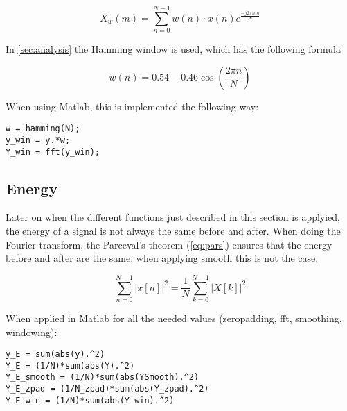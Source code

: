 \begin{equation}
\label{eq:window}
X_w(m) = \sum_{n=0}^{N-1} w(n)\cdot x(n)e^{\frac{-j2\pi nm}{N}}
\end{equation}

In \cref{sec:analysis} the Hamming window is used, which has the following formula

\begin{equation}
\label{eq:hamming}
w(n) = 0.54-0.46\cos\left(\frac{2\pi n}{N}\right)
\end{equation}

When using Matlab, this is implemented the following way:

\begin{verbatim}
w = hamming(N);
y_win = y.*w;
Y_win = fft(y_win);
\end{verbatim}

\subsection{Energy}
Later on when the different functions just described in this section is applyied, the energy of a signal is not always the same before and after. When doing the Fourier transform, the Parceval's theorem (\cref{eq:pars}) ensures that the energy before and after are the same, when applying smooth this is not the case.

\begin{equation}
	\sum_{n=0}^{N-1}\left|x\left[n\right]\right|^2=\frac{1}{N}\sum_{k=0}^{N-1}\left|X\left[k\right]\right|^2
	\label{eq:pars}
\end{equation}

When applied in Matlab for all the needed values (zeropadding, fft, smoothing, windowing):

\begin{verbatim}
y_E = sum(abs(y).^2)
Y_E = (1/N)*sum(abs(Y).^2)
Y_E_smooth = (1/N)*sum(abs(YSmooth).^2)
Y_E_zpad = (1/N_zpad)*sum(abs(Y_zpad).^2)
Y_E_win = (1/N)*sum(abs(Y_win).^2)
\end{verbatim}